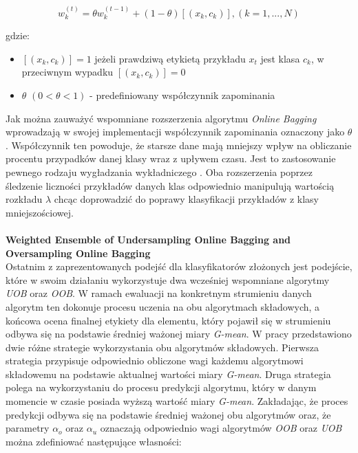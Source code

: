 \begin{equation}
    w^{(t)}_k = \theta w^{(t-1)}_k + (1 - \theta)[(x_k, c_k)], (k = 1, ..., N)
\end{equation}

\noindent gdzie:

\begin{itemize}
    \item $[(x_k, c_k)] = 1$ jeżeli prawdziwą etykietą przykładu $x_t$ jest klasa $c_k$, w przeciwnym wypadku $[(x_k, c_k)] = 0$
    \item $\theta$ $(0 < \theta < 1)$ - predefiniowany współczynnik zapominania
\end{itemize}

\noindent Jak można zauważyć wspomniane rozszerzenia algorytmu \textit{Online Bagging} wprowadzają w swojej implementacji współczynnik zapominania oznaczony jako $\theta$. Współczynnik ten powoduje, że starsze dane mają mniejszy wpływ na obliczanie procentu przypadków danej klasy wraz z upływem czasu. Jest to zastosowanie pewnego rodzaju wygładzania wykładniczego \cite{Article:OBSecond}. Oba rozszerzenia poprzez śledzenie liczności przykładów danych klas odpowiednio manipulują wartością rozkładu $\lambda$ chcąc doprowadzić do poprawy klasyfikacji przykładów z klasy mniejszościowej.\\\\
\textbf{Weighted Ensemble of Undersampling Online Bagging and Oversampling Online Bagging}\\

\noindent Ostatnim z zaprezentowanych podejść dla klasyfikatorów złożonych jest podejście, które w swoim działaniu wykorzystuje dwa wcześniej wspomniane algorytmy \textit{UOB} oraz \textit{OOB}. W ramach ewaluacji na konkretnym strumieniu danych algorytm ten dokonuje procesu uczenia na obu algorytmach składowych, a końcowa ocena finalnej etykiety dla elementu, który pojawił się w strumieniu odbywa się na podstawie średniej ważonej miary \textit{G-mean}. W pracy \cite{Article:OBSecond} przedstawiono dwie różne strategie wykorzystania obu algorytmów składowych. Pierwsza strategia przypisuje odpowiednio obliczone wagi każdemu algorytmowi składowemu na podstawie aktualnej wartości miary \textit{G-mean}. Druga strategia polega na wykorzystaniu do procesu predykcji algorytmu, który w danym momencie w czasie posiada wyższą wartość miary \textit{G-mean}. Zakładając, że proces predykcji odbywa się na podstawie średniej ważonej obu algorytmów oraz, że parametry $\alpha_o$ oraz $\alpha_u$ oznaczają odpowiednio wagi algorytmów \textit{OOB} oraz \textit{UOB} można zdefiniować następujące własności:


